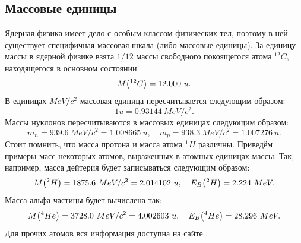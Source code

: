\documentclass[12pt]{article}
\begin{document}
\subsection{Массовые единицы}
Ядерная физика имеет дело с особым классом физических тел, поэтому в ней существует специфичная массовая шкала (либо массовые единицы). За единицу массы в ядерной физике взята $1/12$ массы свободного покоящегося атома ${}^{12}C$, находящегося в основном состоянии:
\begin{equation}
M\qty({}^{12}C) = 12.000\ u.
\end{equation}
В единицах $MeV/c^2$ массовая единица пересчитывается следующим образом:
\begin{equation}
1 u = 0.93144\ MeV/c^2.
\end{equation}
Массы нуклонов пересчитываются в массовых единицах следующим образом:
\begin{equation}
m_n = 939.6\ MeV/c^2 = 1.008665\ u, \quad m_p = 938.3\ MeV/c^2 = 1.007276\ u.
\end{equation}
Стоит помнить, что масса протона и масса атома ${}^1 H$ различны. Приведём примеры масс некоторых атомов, выраженных в атомных единицах массы. Так, например, масса дейтерия будет записываться следующим образом:
\begin{equation}
	M\qty({}^2 H) = 1875.6\ MeV/c^2 = 2.014102\ u,\quad E_B \qty({}^2 H) = 2.224\ MeV.
\end{equation}
Масса альфа\--частицы будет вычислена так:
\begin{equation}
	M\qty({}^4 He) = 3728.0\ MeV/c^2 = 4.002603\ u,\quad E_B \qty({}^4 He) = 28.296\ MeV.
\end{equation}
Для прочих атомов вся информация доступна на сайте \cite{qcalc}.
\end{document}
